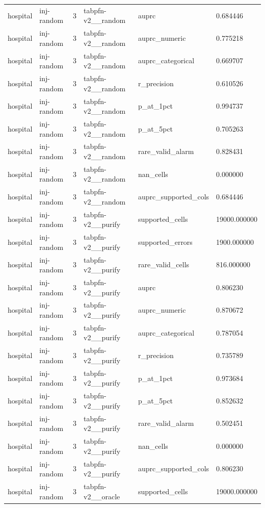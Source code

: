 \begin{tabular}{llllll}
hospital & inj-random & 3 & tabpfn-v2\_\_random & auprc & 0.684446 \\
hospital & inj-random & 3 & tabpfn-v2\_\_random & auprc\_numeric & 0.775218 \\
hospital & inj-random & 3 & tabpfn-v2\_\_random & auprc\_categorical & 0.669707 \\
hospital & inj-random & 3 & tabpfn-v2\_\_random & r\_precision & 0.610526 \\
hospital & inj-random & 3 & tabpfn-v2\_\_random & p\_at\_1pct & 0.994737 \\
hospital & inj-random & 3 & tabpfn-v2\_\_random & p\_at\_5pct & 0.705263 \\
hospital & inj-random & 3 & tabpfn-v2\_\_random & rare\_valid\_alarm & 0.828431 \\
hospital & inj-random & 3 & tabpfn-v2\_\_random & nan\_cells & 0.000000 \\
hospital & inj-random & 3 & tabpfn-v2\_\_random & auprc\_supported\_cols & 0.684446 \\
hospital & inj-random & 3 & tabpfn-v2\_\_purify & supported\_cells & 19000.000000 \\
hospital & inj-random & 3 & tabpfn-v2\_\_purify & supported\_errors & 1900.000000 \\
hospital & inj-random & 3 & tabpfn-v2\_\_purify & rare\_valid\_cells & 816.000000 \\
hospital & inj-random & 3 & tabpfn-v2\_\_purify & auprc & 0.806230 \\
hospital & inj-random & 3 & tabpfn-v2\_\_purify & auprc\_numeric & 0.870672 \\
hospital & inj-random & 3 & tabpfn-v2\_\_purify & auprc\_categorical & 0.787054 \\
hospital & inj-random & 3 & tabpfn-v2\_\_purify & r\_precision & 0.735789 \\
hospital & inj-random & 3 & tabpfn-v2\_\_purify & p\_at\_1pct & 0.973684 \\
hospital & inj-random & 3 & tabpfn-v2\_\_purify & p\_at\_5pct & 0.852632 \\
hospital & inj-random & 3 & tabpfn-v2\_\_purify & rare\_valid\_alarm & 0.502451 \\
hospital & inj-random & 3 & tabpfn-v2\_\_purify & nan\_cells & 0.000000 \\
hospital & inj-random & 3 & tabpfn-v2\_\_purify & auprc\_supported\_cols & 0.806230 \\
hospital & inj-random & 3 & tabpfn-v2\_\_oracle & supported\_cells & 19000.000000 \\

\end{tabular}
